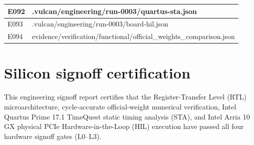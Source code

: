 \documentclass[11pt,a4paper]{article}
\begin{document}
{\begin{longtable}{@{}L{0.12\textwidth}|L{0.82\textwidth}@{}}
E092 & .vulcan/\allowbreak{}engineering/\allowbreak{}run-0003/\allowbreak{}quartus-sta.json\\[2pt]\hline

E093 & .vulcan/\allowbreak{}engineering/\allowbreak{}run-0003/\allowbreak{}board-hil.json\\[2pt]\hline

E094 & evidence/\allowbreak{}verification/\allowbreak{}functional/\allowbreak{}official\_\allowbreak{}weights\_\allowbreak{}comparison.json\\[2pt]\hline

\bottomrule\end{longtable}}

\section{Silicon signoff certification}

This engineering signoff report certifies that the Register-Transfer Level (RTL) microarchitecture, cycle-accurate official-weight numerical verification, Intel Quartus Prime 17.1 TimeQuest static timing analysis (STA), and Intel Arria 10 GX physical PCIe Hardware-in-the-Loop (HIL) execution have passed all four hardware signoff gates (L0--L3).
\end{document}
